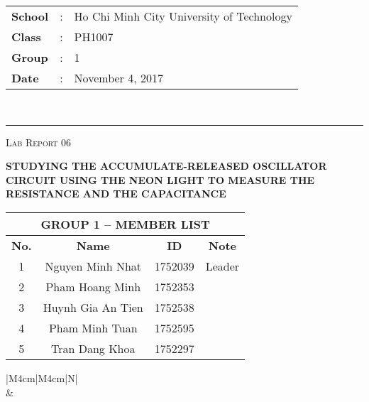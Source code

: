 \documentclass[12pt, a4paper]{article}
\begin{document}
\noindent
\begin{tabular}{lll}
    \textbf{School} & : & Ho Chi Minh City University of Technology \\
    \textbf{Class} & : & PH1007 \\
    \textbf{Group} & : & 1 \\
    \textbf{Date} & : & November 4, 2017 \\
\end{tabular}\\
\rule[2ex]{\textwidth}{2pt}

\vspace{2cm}

\begin{center}
    {\scshape\Large Lab Report 06 \par}
    \vspace{1.5cm}
    {\Huge\bfseries STUDYING THE ACCUMULATE-RELEASED OSCILLATOR CIRCUIT USING THE NEON LIGHT TO MEASURE THE RESISTANCE AND THE CAPACITANCE \par}
    \vspace{3cm}

    \begin{tabular}{|c|c|c|c|}
        \hline 
        \multicolumn{4}{|c|}{\textbf{GROUP 1 -- MEMBER LIST}} \\ 
        \hline 
        \textbf{No.} &\qquad\qquad \textbf{Name}\qquad\qquad\qquad & \qquad\textbf{ID}\qquad\qquad & \qquad\textbf{Note}\qquad\qquad \\ 
        \hline 
        1 & Nguyen Minh Nhat  & 1752039 & Leader \\ 
        \hline 
        2 & Pham Hoang Minh   & 1752353 &  \\ 
        \hline 
        3 & Huynh Gia An Tien & 1752538 &  \\ 
        \hline 
        4 & Pham Minh Tuan    & 1752595 &  \\ 
        \hline 
        5 & Tran Dang Khoa    & 1752297 &  \\ 
        \hline 
    \end{tabular} 

    \vspace{3cm}

    \begin{table}[ht]
        \centering
        \begin{tabular}{|M{4cm}|M{4cm}|N|}
            \hline
             \\
            \hline
             &  \\ [50pt]
            \hline
        \end{tabular}
    \end{table}
\end{center}
\end{document}
